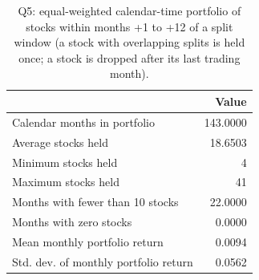 \begin{table}
\caption{Q5: equal-weighted calendar-time portfolio of stocks within months +1 to +12 of a split window (a stock with overlapping splits is held once; a stock is dropped after its last trading month).}
\label{tab:q5}
\begin{tabular}{p{9cm}r}
\toprule
 & Value \\
\midrule
Calendar months in portfolio & 143.0000 \\
Average stocks held & 18.6503 \\
Minimum stocks held & 4 \\
Maximum stocks held & 41 \\
Months with fewer than 10 stocks & 22.0000 \\
Months with zero stocks & 0.0000 \\
Mean monthly portfolio return & 0.0094 \\
Std. dev. of monthly portfolio return & 0.0562 \\
\bottomrule
\end{tabular}
\end{table}
